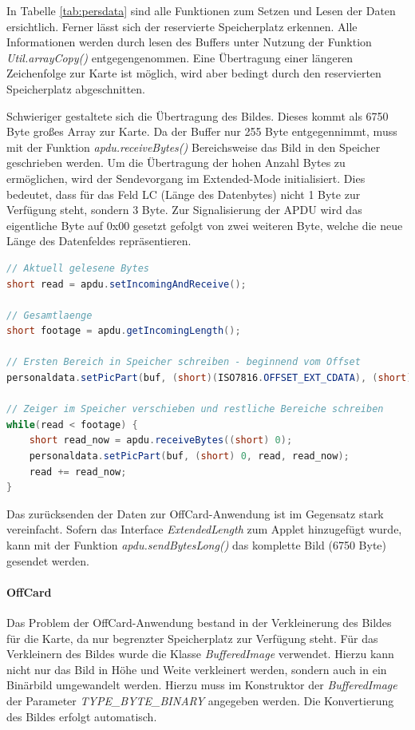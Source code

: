 \documentclass[	a4paper,
			11pt,
			oneside,
			parskip]{scrartcl}
\begin{document}
In Tabelle \ref{tab:persdata} sind alle Funktionen zum Setzen und Lesen der Daten ersichtlich. Ferner lässt sich der reservierte Speicherplatz erkennen. Alle Informationen werden durch lesen des Buffers unter Nutzung der Funktion \textit{Util.arrayCopy()} entgegengenommen. Eine Übertragung einer längeren Zeichenfolge zur Karte ist möglich, wird aber bedingt durch den reservierten Speicherplatz abgeschnitten.

Schwieriger gestaltete sich die Übertragung des Bildes. Dieses kommt als 6750 Byte großes Array zur Karte. Da der Buffer nur 255 Byte entgegennimmt, muss mit der Funktion \textit{apdu.receiveBytes()} Bereichsweise das Bild in den Speicher geschrieben werden. Um die Übertragung der hohen Anzahl Bytes zu ermöglichen, wird der Sendevorgang im Extended-Mode initialisiert. Dies bedeutet, dass für das Feld LC (Länge des Datenbytes) nicht 1 Byte zur Verfügung steht, sondern 3 Byte. Zur Signalisierung der APDU wird das eigentliche Byte auf 0x00 gesetzt gefolgt von zwei weiteren Byte, welche die neue Länge des Datenfeldes repräsentieren.

\begin{center}
\begin{minipage}{0.9\textwidth} 
\begin{lstlisting}[language=Java]
// Aktuell gelesene Bytes
short read = apdu.setIncomingAndReceive();

// Gesamtlaenge
short footage = apdu.getIncomingLength();
	
// Ersten Bereich in Speicher schreiben - beginnend vom Offset		
personaldata.setPicPart(buf, (short)(ISO7816.OFFSET_EXT_CDATA), (short) 0, read);

// Zeiger im Speicher verschieben und restliche Bereiche schreiben		
while(read < footage) {
	short read_now = apdu.receiveBytes((short) 0);
	personaldata.setPicPart(buf, (short) 0, read, read_now);
	read += read_now;
}\end{lstlisting}
\end{minipage}
\end{center}

Das zurücksenden der Daten zur OffCard-Anwendung ist im Gegensatz stark vereinfacht. Sofern das Interface \textit{ExtendedLength} zum Applet hinzugefügt wurde, kann mit der Funktion \textit{apdu.sendBytesLong()} das komplette Bild (6750 Byte) gesendet werden.

\paragraph{OffCard} Das Problem der OffCard-Anwendung bestand in der Verkleinerung des Bildes für die Karte, da nur begrenzter Speicherplatz zur Verfügung steht. Für das Verkleinern des Bildes wurde die Klasse \textit{BufferedImage} verwendet. Hierzu kann nicht nur das Bild in Höhe und Weite verkleinert werden, sondern auch in ein Binärbild umgewandelt werden. Hierzu muss im Konstruktor der \textit{BufferedImage} der Parameter \textit{TYPE\_BYTE\_BINARY} angegeben werden. Die Konvertierung des Bildes erfolgt automatisch.
\end{document}
